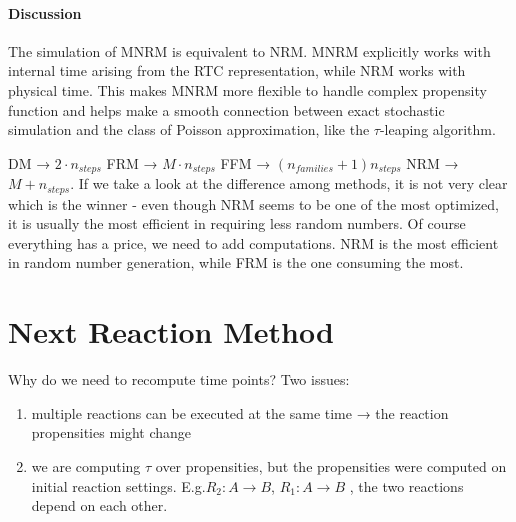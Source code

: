       \paragraph{Discussion}
      The simulation of MNRM is equivalent to NRM.
      MNRM explicitly works with internal time arising from the RTC representation, while NRM works with physical time.
      This makes MNRM more flexible to handle complex propensity function and helps make a smooth connection between exact stochastic simulation and the class of Poisson approximation, like the $\tau$-leaping algorithm.






































DM → $2 \cdot n_{steps}$ FRM → $M \cdot n_{steps}$ FFM → $(n_{families}+ 1)n_{steps}$ NRM → $M+n_{steps}$.
If we take a look at the difference among methods, it is not very clear which is the winner - even though NRM seems to be one of the most optimized, it is usually the most efficient in requiring less random numbers.
Of course everything has a price, we need to add computations.
NRM is the most efficient in random number generation, while FRM is the one consuming the most.

\section{Next Reaction Method}
Why do we need to recompute time points? Two issues:

\begin{enumerate}
  \def\labelenumi{\arabic{enumi}.}
  \item multiple reactions can be executed at the same time → the reaction propensities might change \item we are computing $\tau$ over propensities, but the propensities were computed on initial reaction settings.
  E.g.$R_2:A \rightarrow B$, $R_1 : A \rightarrow B$ , the two reactions depend on each other.
\end{enumerate}

